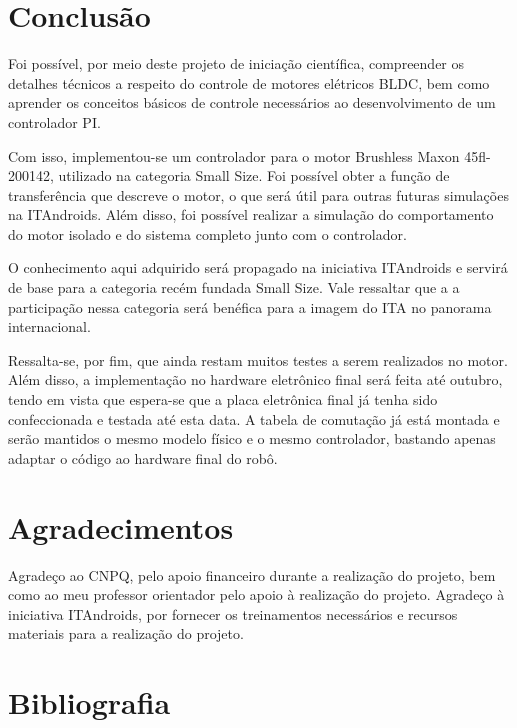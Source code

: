 \documentclass[a4paper,11pt]{article}
\begin{document}
	\section{Conclusão}
	
	Foi possível, por meio deste projeto de iniciação científica, compreender os detalhes técnicos a respeito do controle de motores elétricos BLDC, bem como aprender os conceitos básicos de controle necessários ao desenvolvimento de um controlador PI.
	
	Com isso, implementou-se um controlador para o motor Brushless Maxon 45fl-200142, utilizado na categoria Small Size. Foi possível obter a função de transferência que descreve o motor, o que será útil para outras futuras simulações na ITAndroids. Além disso, foi possível realizar a simulação do comportamento do motor isolado e do sistema completo junto com o controlador.
	
	O conhecimento aqui adquirido será propagado na iniciativa ITAndroids e servirá de base para a categoria recém fundada Small Size. Vale ressaltar que a a participação nessa categoria será benéfica para a imagem do ITA no panorama internacional.
	
	Ressalta-se, por fim, que ainda restam muitos testes a serem realizados no motor. Além disso, a implementação no hardware eletrônico final será feita até outubro, tendo em vista que espera-se que a placa eletrônica final já tenha sido confeccionada e testada até esta data.  A tabela de comutação já está montada e serão mantidos o mesmo modelo físico e o mesmo controlador, bastando apenas adaptar o código ao hardware final do robô.
	
	\section{Agradecimentos}
	Agradeço ao CNPQ, pelo apoio financeiro durante a realização do projeto, bem como ao meu professor orientador pelo apoio à realização do projeto. Agradeço à iniciativa ITAndroids, por fornecer os treinamentos necessários e recursos materiais para a realização do projeto.
	
	\section{Bibliografia}
	\printbibliography[heading=none]
	
\end{document}
